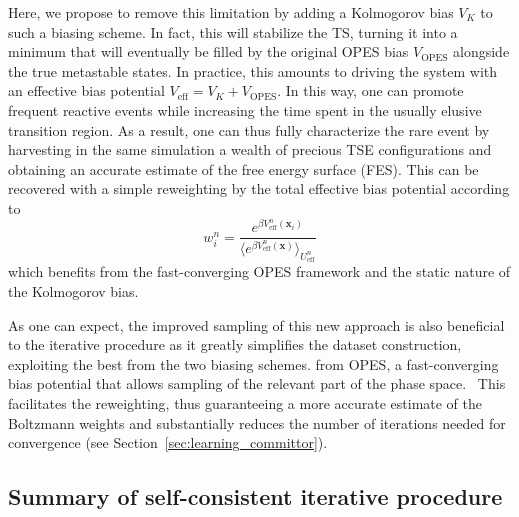         Here, we propose to remove this limitation by adding a Kolmogorov bias $V_K$ to such a biasing scheme. 
        In fact, this will stabilize the TS, turning it into a minimum that will eventually be filled by the original OPES bias $V_{\text{OPES}}$ alongside the true metastable states. 
        In practice, this amounts to driving the system with an effective bias potential $V_{\text{eff}} = V_K + V_{\text{OPES}}$.
        In this way, one can promote frequent reactive events while increasing the time spent in the usually elusive transition region. 
        As a result, one can thus fully characterize the rare event by harvesting in the same simulation a wealth of precious TSE configurations and obtaining an accurate estimate of the free energy surface (FES).
        This can be recovered with a simple reweighting by the total effective bias potential according to 
        \begin{equation}
            w^n_i = \frac{e^{\beta V_{\text{eff}}^n(\textbf{x}_i)}}{\langle e^{\beta V_{\text{eff}}^n(\textbf{x})} \rangle_{U^n_{\text{eff}}} }
        \end{equation}
        which benefits from the fast-converging OPES framework and the static nature of the Kolmogorov bias. 
        
        As one can expect, the improved sampling of this new approach is also beneficial to the iterative procedure as it greatly simplifies the dataset construction, exploiting the best from the two biasing schemes.
         from OPES,  a fast-converging bias potential that allows sampling of the relevant part of the phase space.~\cite{invernizzi2022exploration, trizio2024advanced}
        This facilitates the reweighting, thus guaranteeing a more accurate estimate of the Boltzmann weights and substantially reduces the number of iterations needed for convergence (see Section~\ref{sec:learning_committor}).
        
        
    \subsection{Summary of self-consistent iterative procedure}
    \label{sec:summary}

